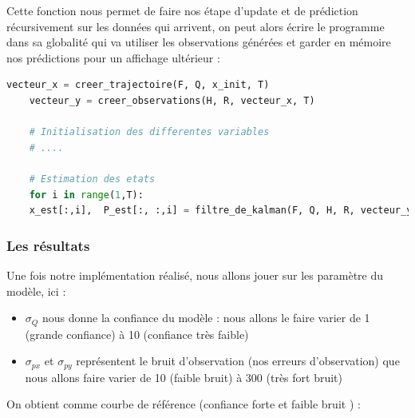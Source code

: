 Cette fonction nous permet de faire nos étape d'update et de prédiction récursivement sur les données qui arrivent, on peut alors écrire le programme dans sa globalité qui va utiliser les observations générées et garder en mémoire nos prédictions pour un affichage ultérieur :

\begin{lstlisting}[language=Python, caption=Fonction principale filtre de kalman simple]
	vecteur_x = creer_trajectoire(F, Q, x_init, T)
	vecteur_y = creer_observations(H, R, vecteur_x, T)
	
	# Initialisation des differentes variables
	# ....
	
	# Estimation des etats
	for i in range(1,T):
	x_est[:,i],  P_est[:, :,i] = filtre_de_kalman(F, Q, H, R, vecteur_y[:,i], x_est[:,i-1], P_est[:, :,i-1])
\end{lstlisting}



\newpage

\subsubsection{Les résultats}

Une fois notre implémentation réalisé, nous allons jouer sur les paramètre du modèle, ici :
\begin{itemize}
	\item $\sigma_{Q}$ nous donne la confiance du modèle : nous allons le faire varier de 1 (grande confiance) à 10 (confiance très faible)
	\item $\sigma_{px}$ et $\sigma_{py}$ représentent le bruit d'observation (nos erreurs d'observation) que nous allons faire varier de 10 (faible bruit) à 300 (très fort bruit)
\end{itemize}


On obtient comme courbe de référence (confiance forte et faible bruit ) :

